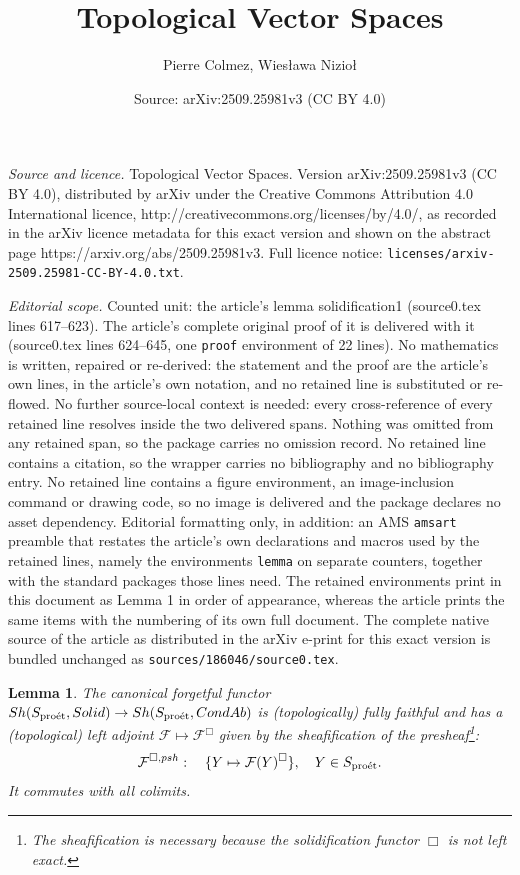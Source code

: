 \documentclass[10pt,a4paper]{amsart}
\title{Topological Vector Spaces}
\author{Pierre Colmez, Wies{\l}awa Nizio{\l}}
\date{Source: arXiv:2509.25981v3 (CC BY 4.0)}
\newtheorem{lemma}{Lemma}
\newcommand{\proeet}{\operatorname{pro\acute{e}t} }
\newcommand{\sff}{{\mathcal{F}}}
\begin{document}
\maketitle

\noindent\emph{Source and licence.} Topological Vector Spaces. Version arXiv:2509.25981v3 (CC BY 4.0), distributed by arXiv under the Creative Commons Attribution 4.0 International licence, http://creativecommons.org/licenses/by/4.0/, as recorded in the arXiv licence metadata for this exact version and shown on the abstract page https://arxiv.org/abs/2509.25981v3. Full licence notice: \texttt{licenses/arxiv-2509.25981-CC-BY-4.0.txt}.\par\smallskip

\noindent\textit{Editorial scope.} Counted unit: the article's lemma solidification1 (source0.tex lines 617--623). The article's complete original proof of it is delivered with it (source0.tex lines 624--645, one \texttt{proof} environment of 22 lines). No mathematics is written, repaired or re-derived: the statement and the proof are the article's own lines, in the article's own notation, and no retained line is substituted or re-flowed.  No further source-local context is needed: every cross-reference of every retained line resolves inside the two delivered spans.  Nothing was omitted from any retained span, so the package carries no omission record.  No retained line contains a citation, so the wrapper carries no bibliography and no bibliography entry.  No retained line contains a figure environment, an image-inclusion command or drawing code, so no image is delivered and the package declares no asset dependency.  Editorial formatting only, in addition: an AMS \texttt{amsart} preamble that restates the article's own declarations and macros used by the retained lines, namely the environments \texttt{lemma} on separate counters, together with the standard packages those lines need.  The retained environments print in this document as Lemma 1 in order of appearance, whereas the article prints the same items with the numbering of its own full document.  The complete native source of the article as distributed in the arXiv e-print for this exact version is bundled unchanged as \texttt{sources/186046/source0.tex}.
\begin{lemma}\label{solidification1}
 The canonical forgetful functor ${\rm Sh}(S_{\proeet},{\rm Solid})\to {\rm Sh}(S_{\proeet},{\rm CondAb})$ is (topologically)  fully faithful and has a (topological) left adjoint $\sff\mapsto \sff^{\Box}$ given by the sheafification of the presheaf\footnote{The sheafification is necessary because the solidification functor $\Box$ is not left exact.}:
 $$
{\sff}^{\Box,{\rm psh}}:\quad  \{Y\mapsto \sff(Y)^{\Box}\},\quad Y\in S_{\proeet}.
 $$
 It commutes with all colimits. 
 \end{lemma}
\end{document}
